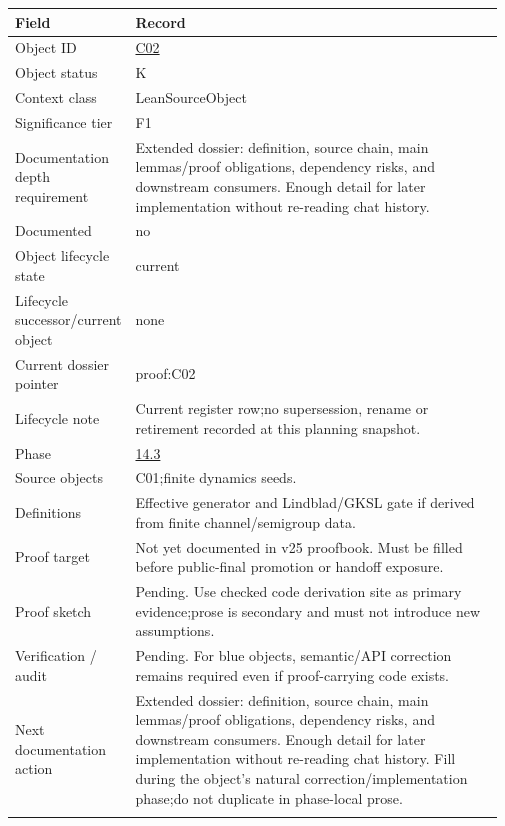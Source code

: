 \begin{longtable}{L{0.16\linewidth} L{0.81\linewidth}}
\hline
\textbf{Field} & \textbf{Record}\\
\hline
Object ID & \hyperlink{object-row-C02}{C02}\\
\hline\addlinespace[0.20em]
Object status & K\\
\hline\addlinespace[0.20em]
Context class & LeanSourceObject\\
\hline\addlinespace[0.20em]
Significance tier & F1\\
\hline\addlinespace[0.20em]
Documentation depth requirement & Extended dossier: definition, source chain, main lemmas/\allowbreak{}proof obligations, dependency risks, and downstream consumers. Enough detail for later implementation without re-reading chat history.\\
\hline\addlinespace[0.20em]
Documented & no\\
\hline\addlinespace[0.20em]
Object lifecycle state & current\\
\hline\addlinespace[0.20em]
Lifecycle successor/\allowbreak{}current object & none\\
\hline\addlinespace[0.20em]
Current dossier pointer & proof:C02\\
\hline\addlinespace[0.20em]
Lifecycle note & Current register row;\newline no supersession, rename or retirement recorded at this planning snapshot.\\
\hline\addlinespace[0.20em]
Phase & \hyperlink{phase-row-14-3}{14.3}\\
\hline\addlinespace[0.20em]
Source objects & C01;\newline finite dynamics seeds.\\
\hline\addlinespace[0.20em]
Definitions & Effective generator and Lindblad/\allowbreak{}GKSL gate if derived from finite channel/\allowbreak{}semigroup data.\\
\hline\addlinespace[0.20em]
Proof target & Not yet documented in v25 proofbook. Must be filled before public-final promotion or handoff exposure.\\
\hline\addlinespace[0.20em]
Proof sketch & Pending. Use checked code derivation site as primary evidence;\newline prose is secondary and must not introduce new assumptions.\\
\hline\addlinespace[0.20em]
Verification /\allowbreak{} audit & Pending. For blue objects, semantic/\allowbreak{}API correction remains required even if proof-carrying code exists.\\
\hline\addlinespace[0.20em]
Next documentation action & Extended dossier: definition, source chain, main lemmas/\allowbreak{}proof obligations, dependency risks, and downstream consumers. Enough detail for later implementation without re-reading chat history. Fill during the object's natural correction/\allowbreak{}implementation phase;\newline do not duplicate in phase-local prose.\\
\hline\addlinespace[0.20em]
\end{longtable}
